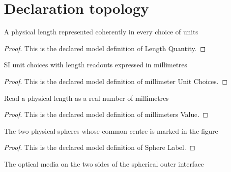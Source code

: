 \section{Declaration topology}
\begin{definition}
  \label{def:physics:phyx-mini-0106:phyxminiproblems-problemphyxmini0106-lengthquantity}
  A physical length represented coherently in every choice of units
\end{definition}
\begin{proof}
  This is the declared model definition of Length Quantity.
\end{proof}
\begin{definition}
  \label{def:physics:phyx-mini-0106:phyxminiproblems-problemphyxmini0106-millimeterunitchoices}
  SI unit choices with length readouts expressed in millimetres
\end{definition}
\begin{proof}
  This is the declared model definition of millimeter Unit Choices.
\end{proof}
\begin{definition}
  \label{def:physics:phyx-mini-0106:phyxminiproblems-problemphyxmini0106-millimetersvalue}
  Read a physical length as a real number of millimetres
\end{definition}
\begin{proof}
  This is the declared model definition of millimeters Value.
\end{proof}
\begin{definition}
  \label{def:physics:phyx-mini-0106:phyxminiproblems-problemphyxmini0106-spherelabel}
  The two physical spheres whose common centre is marked in the figure
\end{definition}
\begin{proof}
  This is the declared model definition of Sphere Label.
\end{proof}
\begin{definition}
  \label{def:physics:phyx-mini-0106:phyxminiproblems-problemphyxmini0106-opticalmedium}
  The optical media on the two sides of the spherical outer interface
\end{definition}
